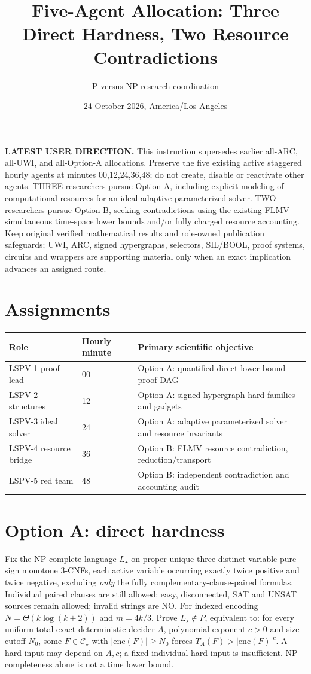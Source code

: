 \documentclass[11pt]{article}
\title{Five-Agent Allocation: Three Direct Hardness, Two Resource Contradictions}
\author{P versus NP research coordination}
\date{24 October 2026, America/Los Angeles}
\begin{document}
\maketitle
\noindent\textbf{LATEST USER DIRECTION.} This instruction supersedes earlier all-ARC, all-UWI, and all-Option-A allocations. Preserve the five existing active staggered hourly agents at minutes 00,12,24,36,48; do not create, disable or reactivate other agents. THREE researchers pursue Option A, including explicit modeling of computational resources for an ideal adaptive parameterized solver. TWO researchers pursue Option B, seeking contradictions using the existing FLMV simultaneous time-space lower bounds and/or fully charged resource accounting. Keep original verified mathematical results and role-owned publication safeguards; UWI, ARC, signed hypergraphs, selectors, SIL/BOOL, proof systems, circuits and wrappers are supporting material only when an exact implication advances an assigned route.

\section*{Assignments}
\begin{tabular}{lll}
\toprule
Role & Hourly minute & Primary scientific objective\\
\midrule
LSPV-1 proof lead & 00 & Option A: quantified direct lower-bound proof DAG\\
LSPV-2 structures & 12 & Option A: signed-hypergraph hard families and gadgets\\
LSPV-3 ideal solver & 24 & Option A: adaptive parameterized solver and resource invariants\\
LSPV-4 resource bridge & 36 & Option B: FLMV resource contradiction, reduction/transport\\
LSPV-5 red team & 48 & Option B: independent contradiction and accounting audit\\
\bottomrule
\end{tabular}

\section*{Option A: direct hardness}
Fix the NP-complete language $L_\star$ on proper unique three-distinct-variable pure-sign monotone $3$-CNFs, each active variable occurring exactly twice positive and twice negative, excluding \emph{only} the fully complementary-clause-paired formulas. Individual paired clauses are still allowed; easy, disconnected, SAT and UNSAT sources remain allowed; invalid strings are NO. For indexed encoding $N=\Theta(k\log(k+2))$ and $m=4k/3$. Prove $L_\star\notin P$, equivalent to: for every uniform total exact deterministic decider $A$, polynomial exponent $c>0$ and size cutoff $N_0$, some $F\in\mathcal C_\star$ with $|\mathrm{enc}(F)|\ge N_0$ forces $T_A(F)>|\mathrm{enc}(F)|^c$. A hard input may depend on $A,c$; a fixed individual hard input is insufficient. NP-completeness alone is not a time lower bound.
\end{document}
